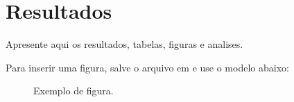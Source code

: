 \chapter{Resultados}

Apresente aqui os resultados, tabelas, figuras e analises.

Para inserir uma figura, salve o arquivo em  e use o modelo abaixo:

\begin{figure}[H]
  \centering
  \caption{Exemplo de figura.}
  \label{fig:exemplo}
\end{figure}

